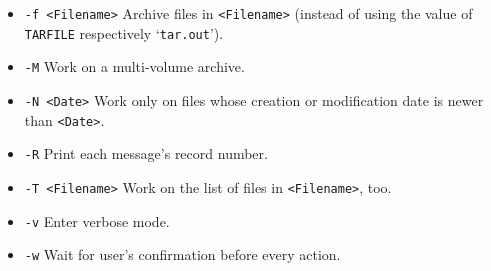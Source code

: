 \begin{man}
\begin{itemize}
\begin{itemize}
               \item {\tt -f <Filename>}\newline
                 Archive files in {\tt <Filename>} (instead of using the value of
                 {\tt TARFILE} respectively `{\tt tar.out}').

               \item {\tt -M}\newline
                 Work on a multi-volume archive.

               \item {\tt -N <Date>}\newline
                 Work only on files whose creation or modification date is
                 newer than {\tt <Date>}.

               \item {\tt -R}\newline
                 Print each message's record number.

               \item {\tt -T <Filename>}\newline
                 Work on the list of files in {\tt <Filename>}, too.

               \item {\tt -v}\newline
                 Enter verbose mode.

               \item {\tt -w}\newline
                 Wait for user's confirmation before every action.
               \end{itemize}
             \end{itemize}
\end{man}
